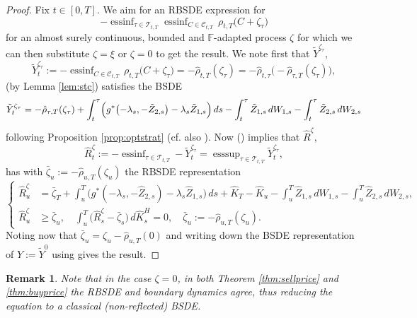 \documentclass{article}
\DeclareMathOperator*{\essinf}{ess inf}
\DeclareMathOperator*{\esssup}{ess sup}
\newtheorem{remark}[definition]{Remark}
\begin{document}
\begin{proof}
	Fix $t \in [0,T]$. We aim for an RBSDE expression for
	\[
		- \essinf_{\tau\in \mathcal{T}_{t,T}}  \essinf_{C \in \mathcal{C}_{t,T}} \, \rho_{t,T}\bigl(C +\zeta_\tau\bigr)
	\]
	for an almost surely continuous, bounded and $\mathbb{F}$-adapted process $\zeta$ for which we can then substitute $\zeta = \xi$ or $\zeta = 0$ to get the result. We 
	note first that $\tilde{Y}^{\zeta_\tau}$, 
	\[
		\tilde{Y}^{\zeta_\tau}_t := -\essinf_{C \in \mathcal{C}_{t,T}} \, \rho_{t,T}\bigl(C +\zeta_\tau\bigr) = -\hat{\rho}_{t,T}(\zeta_\tau) = 
		-\hat{\rho}_{t,\tau}\bigl( - \hat{\rho}_{\tau,T}(\zeta_\tau)\bigr),
	\]
	(by Lemma \ref{lem:stc}) satisfies the BSDE
	\[
		\tilde{Y}^{\zeta_\tau}_t =   - \hat{\rho}_{\tau,T}(\zeta_\tau)   +\int_t^\tau \Bigl( g^*\bigl(-\lambda_s, -\tilde{Z}_{2,s}\bigr) -\lambda_s\tilde{Z}_{1,s}\Bigr) \,
		ds  -\int_t^\tau\tilde{Z}_{1,s} \, dW_{1,s} -\int_t^\tau\tilde{Z}_{2,s} \, dW_{2,s}
	\]
	following Proposition \ref{prop:optstrat} (cf. also \cite[Proposition 2.7]{SS15}). Now (\cite[Proposition 3.1]{KLQT02}) implies that $\hat{R}^\zeta$, 
	\[
		\hat{R}^\zeta_t := -\essinf_{\tau\in \mathcal{T}_{t,T}} -\tilde{Y}^{\zeta_\tau}_t  = \esssup_{\tau\in \mathcal{T}_{t,T}} \tilde{Y}^{\zeta_\tau}_t,
	\]
	has with $\bar{\zeta}_u := - \hat{\rho}_{u,T}(\zeta_u)$ the RBSDE representation
	\[
		\left\{\begin{array}{ll}
		\hat{R}^\zeta_u &=  \bar{\zeta}_T +\int_u^T \bigl(g^*(-\lambda_s, -\hat{Z}_{2,s}) - \lambda_s\hat{Z}_{1,s}\bigr) \, ds +\hat{K}_T-\hat{K}_u -
		\int_u^T\hat{Z}_{1,s}\,  dW_{1,s} -\int_u^T\hat{Z}_{2,s} \, dW_{2,s}, \\
		\hat{R}^\zeta_u &\geq  \bar{\zeta}_u  , \quad 
		\int_u^T\bigl(\hat{R}^\zeta_s - \bar{\zeta}_s \bigr) \, d\hat{K}_s^H=0, \quad \bar{\zeta}_u := -\hat{\rho}_{u,T}(\zeta_u).
		\end{array} \right.
	\]
	Noting now that $ \bar{\zeta}_u = \zeta_u-\hat{\rho}_{u,T}(0)$ and writing down the BSDE representation of $Y := \tilde{Y}^{0}$ using \cite[Proposition 2.7]{SS15} 
	gives the result.
\end{proof}

\begin{remark}\label{rem:boundary}
	Note that in the case $\zeta = 0$, in both Theorem \ref{thm:sellprice} and \ref{thm:buyprice} the RBSDE and boundary dynamics agree, thus reducing the equation to a 
	classical (non-reflected) BSDE.
\end{remark}
\end{document}
